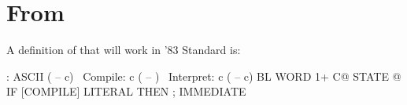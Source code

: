 \section{From }

A definition of  that will work in '83
Standard is:
\begin{Code}
: ASCII  ( -- c)  \  Compile:  c  ( -- )
\ Interpret:   c   ( -- c)
     BL WORD 1+ C@  STATE @
     IF [COMPILE] LITERAL  THEN ; IMMEDIATE
\end{Code}

